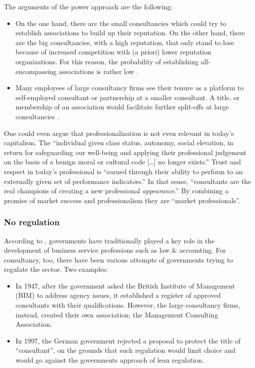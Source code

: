 \documentclass[12pt]{article}
\begin{document}
The arguments of the power approach are the following:

\begin{itemize}
\item
  On the one hand, there are the small consultancies which could try to
  establish associations to build up their reputation. On the other
  hand, there are the big consultancies, with a high reputation, that
  only stand to lose because of increased competition with (a priori)
  lower reputation organizations. For this reason, the probability of
  establishing all-encompassing associations is rather low \citep[
  77]{kieser2006}.
\item
  Many employees of large consultancy firms see their tenure as a
  platform to self-employed consultant or partnership at a smaller
  consultant. A title, or membership of an association would facilitate
  further split-offs at large consultancies \citep[ 80]{kieser2006}.
\end{itemize}

One could even argue that professionalization is not even relevant in
today's capitalism. The ``individual given class status, autonomy,
social elevation, in return for safeguarding our well-being and applying
their professional judgement on the basis of a benign moral or cultural
code {[}\ldots{]} no longer exists.'' \citep[1-2]{dent2013} Trust and
respect in today's professional is ``earned through their ability to
perform to an externally given set of performance indicators.'' In that
sense, ``consultants are the real champions of creating a new
professional \emph{appearance}.'' \citep[ 95]{kieser2006} By combining a
promise of market success and professionalism they are ``market
professionals''.

\subsubsection{No regulation}\label{no-regulation}

According to \citet[813]{muzio2011}, governments have traditionally
played a key role in the development of business service professions
such as law \& accounting. For consultancy, too, there have been various
attempts of governments trying to regulate the sector. Two examples:

\begin{itemize}
\item
  In 1947, after the government asked the British Institute of
  Management (BIM) to address agency issues, it established a register
  of approved consultants with their qualifications. However, the large
  consultancy firms, instead, created their own association; the
  Management Consulting Association.
\item
  In 1997, the German government rejected a proposal to protect the
  title of ``consultant'', on the grounds that such regulation would
  limit choice and would go against the governments approach of lean
  regulation.
\end{itemize}
\end{document}
